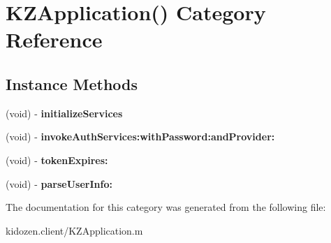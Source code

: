 \hypertarget{category_k_z_application_07_08}{\section{K\-Z\-Application() Category Reference}
\label{category_k_z_application_07_08}
}
\subsection*{Instance Methods}
\begin{DoxyCompactItemize}
\item 
\hypertarget{category_k_z_application_07_08_af23d4ca3662845ab3cf1babe5384a384}{(void) -\/ {\bfseries initialize\-Services}}\label{category_k_z_application_07_08_af23d4ca3662845ab3cf1babe5384a384}

\item 
\hypertarget{category_k_z_application_07_08_a3bb91cf372176cb0d63339ea3f1843ca}{(void) -\/ {\bfseries invoke\-Auth\-Services\-:with\-Password\-:and\-Provider\-:}}\label{category_k_z_application_07_08_a3bb91cf372176cb0d63339ea3f1843ca}

\item 
\hypertarget{category_k_z_application_07_08_ac970fb52a06cbf3b77a61cc3cb233e39}{(void) -\/ {\bfseries token\-Expires\-:}}\label{category_k_z_application_07_08_ac970fb52a06cbf3b77a61cc3cb233e39}

\item 
\hypertarget{category_k_z_application_07_08_a3ea3f4bbcb762303d55f6381dc227d63}{(void) -\/ {\bfseries parse\-User\-Info\-:}}\label{category_k_z_application_07_08_a3ea3f4bbcb762303d55f6381dc227d63}

\end{DoxyCompactItemize}


The documentation for this category was generated from the following file\-:\begin{DoxyCompactItemize}
\item 
kidozen.\-client/K\-Z\-Application.\-m\end{DoxyCompactItemize}

